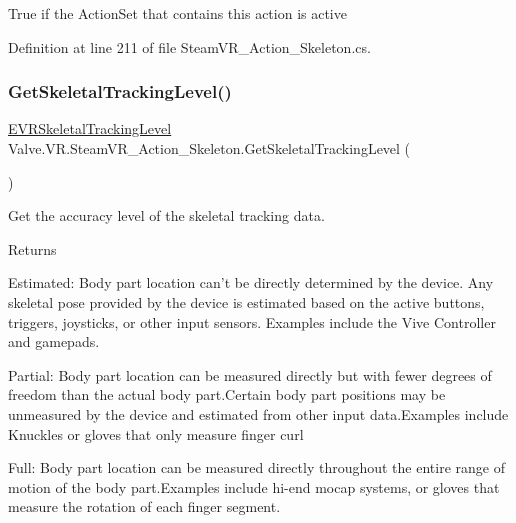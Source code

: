 True if the Action\+Set that contains this action is active 



Definition at line 211 of file Steam\+V\+R\+\_\+\+Action\+\_\+\+Skeleton.\+cs.

\mbox{\label{class_valve_1_1_v_r_1_1_steam_v_r___action___skeleton_af86c841922955baa70deacd0dadb195f}} 
\subsubsection{\texorpdfstring{GetSkeletalTrackingLevel()}{GetSkeletalTrackingLevel()}}
{\footnotesize\ttfamily \mbox{\hyperlink{namespace_valve_1_1_v_r_a6f46bd50fb65255d6537ab32a6bddc30}{E\+V\+R\+Skeletal\+Tracking\+Level}} Valve.\+V\+R.\+Steam\+V\+R\+\_\+\+Action\+\_\+\+Skeleton.\+Get\+Skeletal\+Tracking\+Level (\begin{DoxyParamCaption}{ }\end{DoxyParamCaption})}



Get the accuracy level of the skeletal tracking data. 

\begin{DoxyReturn}{Returns}

\begin{DoxyItemize}
\item Estimated\+: Body part location can’t be directly determined by the device. Any skeletal pose provided by the device is estimated based on the active buttons, triggers, joysticks, or other input sensors. Examples include the Vive Controller and gamepads.  
\item Partial\+: Body part location can be measured directly but with fewer degrees of freedom than the actual body part.\+Certain body part positions may be unmeasured by the device and estimated from other input data.\+Examples include Knuckles or gloves that only measure finger curl 
\item Full\+: Body part location can be measured directly throughout the entire range of motion of the body part.\+Examples include hi-\/end mocap systems, or gloves that measure the rotation of each finger segment. 
\end{DoxyItemize}
\end{DoxyReturn}


